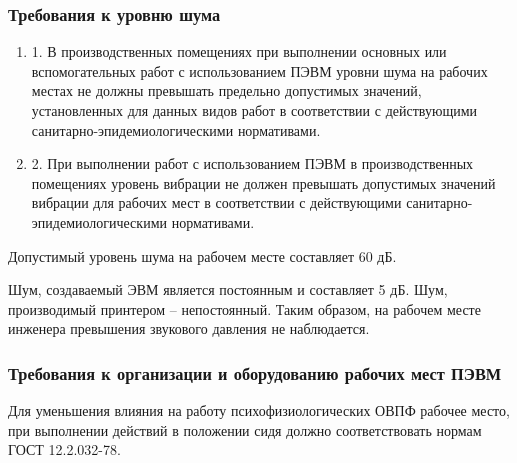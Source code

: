 \subsubsection{Требования к уровню шума}

\begin{enumerate}
 \item 1. В производственных помещениях при выполнении основных или вспомогательных работ с использованием ПЭВМ уровни шума на рабочих местах не должны превышать предельно допустимых значений, установленных для данных видов работ в соответствии с действующими санитарно-эпидемиологическими нормативами.
 \item 2. При выполнении работ с использованием ПЭВМ в производственных помещениях уровень вибрации не должен превышать допустимых значений вибрации для рабочих мест в соответствии с действующими санитарно-эпидемиологическими нормативами.
\end{enumerate}

Допустимый уровень шума на рабочем месте составляет 60 дБ.

Шум, создаваемый ЭВМ является постоянным и составляет 5 дБ. Шум, производимый принтером – непостоянный. Таким образом, на рабочем месте инженера превышения звукового давления не наблюдается.

\subsubsection{Требования к организации и оборудованию рабочих мест ПЭВМ}

Для уменьшения влияния на работу психофизиологических ОВПФ рабочее место, при выполнении действий в положении сидя должно соответствовать нормам ГОСТ 12.2.032-78\cite{OT5}.

